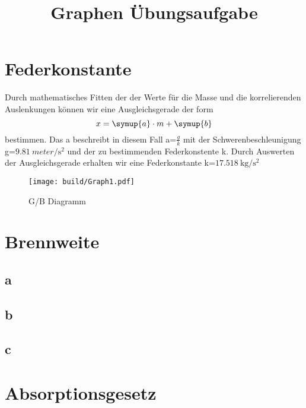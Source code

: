 




\subject{Praktikum}
\title{Graphen Übungsaufgabe}

\maketitle
\thispagestyle{empty}
\newpage

\section{Federkonstante}
    Durch mathematisches Fitten der der Werte für die Masse und die korrelierenden Auslenkungen können wir eine Ausgleichsgerade
    der form 
    \begin{equation}
        x = \symup{a} \cdot m + \symup{b}
    \end{equation} 
    bestimmen. Das a beschreibt in diesem Fall a=$\frac{g}{k}$ mit der Schwerenbeschleunigung g=$\SI{9,81}{meter\per\second\squared}$ 
    und der zu bestimmenden Federkonstente k.
    Durch Auswerten der Ausgleichsgerade erhalten wir eine Federkonstante k=$\SI{17,518}{\kilogram\per\second\squared}$
    \begin{figure}
            \centering
            \texttt{[image: build/Graph1.pdf]}
            \caption{G/B Diagramm}
            \label{fig:plt1}
        \end{figure}
    
    
\newpage

\section{Brennweite}

    \subsection{a}

    \subsection{b}
        

    \subsection{c}
\newpage

\section{Absorptionsgesetz}
    

\printbibliography{}


